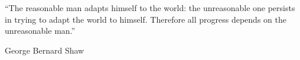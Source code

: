 



\frontmatter %

\pagestyle{plain} %

\maketitlepage


\makeconttitlepage


\begin{epigraph}
\null \vfill
\begin{flushright}

“The reasonable man adapts himself to the world: the unreasonable one persists in trying to adapt the world to himself. Therefore all progress depends on the unreasonable man.”

George Bernard Shaw

\end{flushright}
\vfill \null%
\end{epigraph}%



 




